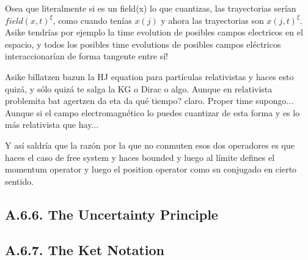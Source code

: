 \documentclass[11pt, a4paper]{article} %
\begin{document}
Osea que literalmente si es un field(x) lo que cuantizas, las trayectorias serían $field(x,t)^\xi$, como cuando tenías $x(j)$ y ahora las trayectorias son $x(j,t)^\xi$. Asike tendrías por ejemplo la time evolution de posibles campos electricos en el espacio, y todos los posibles time evolutions de posibles campos eléctricos interaccionarían de forma tangente entre sí!

Asike billatzen bazun la HJ equation para partículas relativistas y haces esto quizá, y sólo quizá te salga la KG o Dirac o algo. Aunque en relativista problemita bat agertzen da eta da qué tiempo? claro. Proper time supongo... Aunque si el campo electromagnético lo puedes cuantizar de esta forma y es lo más relativista que hay...

Y así saldría que la razón por la que no conmuten esos dos operadores es que haces el caso de free system y haces bounded y luego al límite defines el momentum operator y luego el position operator como su conjugado en cierto sentido.

\subsection*{A.6.6. The Uncertainty Principle}
\subsection*{A.6.7. The Ket Notation}


\newpage
{}
\end{document}

